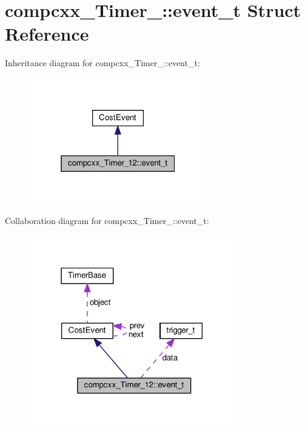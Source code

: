\hypertarget{structcompcxx__Timer__12_1_1event__t}{}\section{compcxx\+\_\+\+Timer\+\_\+:\+:event\+\_\+t Struct Reference}
\label{structcompcxx__Timer__12_1_1event__t}


Inheritance diagram for compcxx\+\_\+\+Timer\+\_\+:\+:event\+\_\+t\+:\nopagebreak
\begin{figure}[H]
\begin{center}
\leavevmode
\includegraphics[width=220pt]{structcompcxx__Timer__12_1_1event__t__inherit__graph}
\end{center}
\end{figure}


Collaboration diagram for compcxx\+\_\+\+Timer\+\_\+:\+:event\+\_\+t\+:\nopagebreak
\begin{figure}[H]
\begin{center}
\leavevmode
\includegraphics[width=254pt]{structcompcxx__Timer__12_1_1event__t__coll__graph}
\end{center}
\end{figure}
